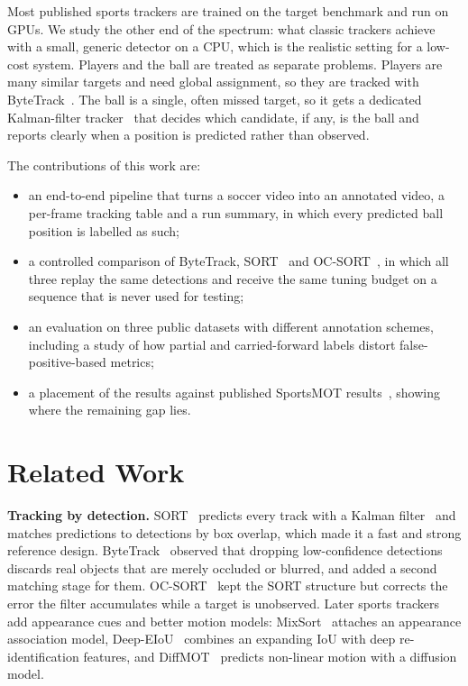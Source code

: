 \documentclass[conference]{IEEEtran}
\begin{document}
Most published sports trackers are trained on the target benchmark and run on
GPUs. We study the other end of the spectrum: what classic trackers achieve with
a small, generic detector on a CPU, which is the realistic setting for a
low-cost system. Players and the ball are treated as separate problems. Players
are many similar targets and need global assignment, so they are tracked with
ByteTrack~\cite{bytetrack}. The ball is a single, often missed target, so it gets
a dedicated Kalman-filter tracker~\cite{kalman} that decides which candidate, if
any, is the ball and reports clearly when a position is predicted rather than
observed.

The contributions of this work are:
\begin{itemize}
\item an end-to-end pipeline that turns a soccer video into an annotated video, a
per-frame tracking table and a run summary, in which every predicted ball
position is labelled as such;
\item a controlled comparison of ByteTrack, SORT~\cite{sort} and
OC-SORT~\cite{ocsort}, in which all three replay the same detections and receive
the same tuning budget on a sequence that is never used for testing;
\item an evaluation on three public datasets with different annotation schemes,
including a study of how partial and carried-forward labels distort
false-positive-based metrics;
\item a placement of the results against published SportsMOT
results~\cite{sportsmot,deepeiou,diffmot}, showing where the remaining gap lies.
\end{itemize}

\section{Related Work}
\textbf{Tracking by detection.} SORT~\cite{sort} predicts every track with a
Kalman filter~\cite{kalman} and matches predictions to detections by box overlap,
which made it a fast and strong reference design. ByteTrack~\cite{bytetrack}
observed that dropping low-confidence detections discards real objects that are
merely occluded or blurred, and added a second matching stage for them.
OC-SORT~\cite{ocsort} kept the SORT structure but corrects the error the filter
accumulates while a target is unobserved. Later sports trackers add appearance
cues and better motion models: MixSort~\cite{sportsmot} attaches an appearance
association model, Deep-EIoU~\cite{deepeiou} combines an expanding IoU with deep
re-identification features, and DiffMOT~\cite{diffmot} predicts non-linear motion
with a diffusion model.
\end{document}
